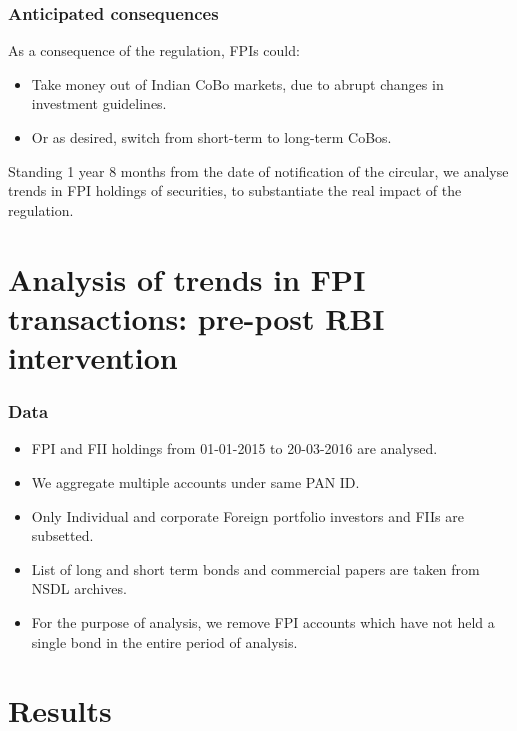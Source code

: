 \documentclass[9pt]{beamer}
\begin{document}
\begin{frame}
  \frametitle{Anticipated consequences}
  As a consequence of the regulation, FPIs could:\\
  \begin{itemize}
  \item Take money out of Indian CoBo markets, due to abrupt changes
    in investment guidelines.
  \item Or as  desired, switch from short-term to long-term CoBos.  
  \end{itemize}
  Standing 1 year 8 months from the date of notification of the
  circular, we analyse trends in FPI holdings of securities, to
  substantiate the real impact of the regulation. 
\end{frame}




\section{Analysis of trends in FPI transactions: pre-post RBI intervention}


\begin{frame}
  \frametitle{Data}
  \begin{itemize}
  \item FPI and FII holdings from 01-01-2015 to 20-03-2016 are
    analysed.
  \item We aggregate multiple accounts under same PAN ID.
  \item Only Individual and corporate Foreign portfolio investors and
    FIIs are subsetted.
  \item List of long and short term bonds and commercial papers are
    taken from NSDL archives.
  \item For the purpose of analysis, we remove FPI accounts which have
    not held a single bond in the entire period of analysis.
 
  \end{itemize}
\end{frame}

\section{Results}
\end{document}
